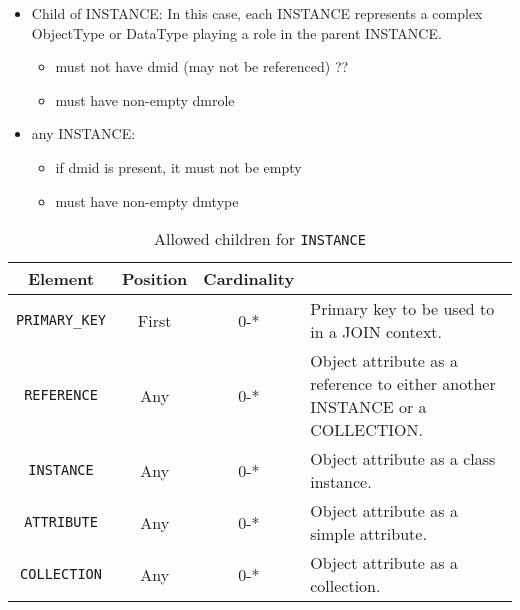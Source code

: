 \begin{itemize}
\begin{itemize}
     \item Child of INSTANCE: In this case, each INSTANCE represents 
           a complex ObjectType or DataType playing a role in the parent
           INSTANCE.     
           \begin{itemize}
             \item must not have dmid (may not be referenced) ??
             \item must have non-empty dmrole
           \end{itemize}
           
     \item any INSTANCE:     
           \begin{itemize}
             \item if dmid is present, it must not be empty
             \item must have non-empty dmtype
           \end{itemize}
    \end{itemize}  
  
\end{itemize}  

 
\begin{table}[!htbp]
\small
\centering
\begin{tabulary}{\linewidth}{|c |c |c|J|}
    \hline 
        \textbf{Element} &
        \textbf{Position} &
        \textbf{Cardinality} &
        \\
    \hline      \hline  
        \texttt{PRIMARY\_KEY}  &        
        First &           
        0-* &
        Primary key to be used to in a JOIN context.\\
    \hline    
        \texttt{REFERENCE}  &        
        Any &           
        0-* &
         Object attribute as a reference to either another INSTANCE or a COLLECTION.\\
    \hline    
        \texttt{INSTANCE} &           
        Any &           
        0-* &
         Object attribute as a class instance. \\
    \hline    
        \texttt{ATTRIBUTE} &           
        Any &           
        0-* &
       Object attribute as a simple attribute. \\
    \hline    
        \texttt{COLLECTION} &           
        Any &           
        0-* &
         Object attribute  as a collection.\\
    \hline 
\end{tabulary}
     \caption{Allowed children for \texttt{INSTANCE}} 
     \label{tbl:instance-chilren}
 \end{table}
 
